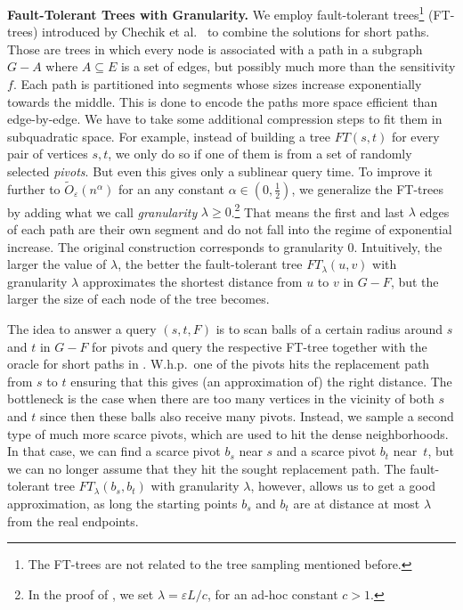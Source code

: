\documentclass{article}\usepackage[a4paper,margin=20mm]{geometry}
\newcommand*{\Otilde}{\widetilde{O}}
\renewcommand{\ge}{\geqslant}
\newcommand{\eps}{\varepsilon}
\begin{document}
\noindent
\textbf{Fault-Tolerant Trees with Granularity.}
We employ fault-tolerant trees\footnote{%
  The FT-trees are not related to the tree sampling mentioned before.
}
(FT-trees) introduced by Chechik et al.~\cite{ChCoFiKa17}
to combine the solutions for short paths.
Those are trees in which every node is associated with a path in a subgraph
$G-A$ where $A \subseteq E$ is a set of edges, but possibly much more than the sensitivity $f$.
Each path is partitioned into segments whose sizes increase exponentially towards the middle.
This is done to encode the paths more space efficient than edge-by-edge.
We have to take some additional compression steps to fit them in subquadratic space.
For example, instead of building a tree $FT(s,t)$ for every pair of vertices $s,t$,
we only do so if one of them is from a set of randomly selected \emph{pivots}.
But even this gives only a sublinear query time.
To improve it further to $\Otilde_\eps(n^\alpha)$ 
for an any constant $\alpha \in (0,\frac{1}{2})$,
we generalize the FT-trees by adding what we call \emph{granularity} $\lambda \ge 0$.\footnote{%
	In the proof of ,
	we set $\lambda = \eps L/c$, for an ad-hoc constant $c > 1$.
}
That means the first and last $\lambda$ edges of each path are their own segment
and do not fall into the regime of exponential increase.
The original construction \cite{ChCoFiKa17} corresponds to granularity $0$.
Intuitively, the larger the value of $\lambda$, the better the fault-tolerant tree $FT_\lambda(u,v)$ with granularity $\lambda$ approximates the shortest distance from $u$ to $v$ in $G-F$, but the larger the size of each node of the tree becomes.

The idea to answer a query $(s,t,F)$ is to scan balls of a certain radius around
$s$ and $t$ in $G-F$ for pivots and query the respective FT-tree together with
the oracle for short paths in .
W.h.p.\ one of the pivots hits the replacement path from $s$ to $t$ ensuring
that this gives (an approximation of) the right distance.
The bottleneck is the case when there are too many vertices in the vicinity of both $s$ and $t$
since then these balls also receive many pivots.
Instead, we sample a second type of much more scarce pivots, 
which are used to hit the dense neighborhoods.
In that case, we can find a scarce pivot $b_s$ near $s$ and a scarce pivot $b_t$ near~$t$, 
but we can no longer assume that they hit the sought replacement path.
The fault-tolerant tree $FT_\lambda(b_s, b_t)$ with granularity $\lambda$, however,
allows us to get a good approximation,
as long the starting points $b_s$ and $b_t$ are at distance at most $\lambda$
from the real endpoints. 
\end{document}
